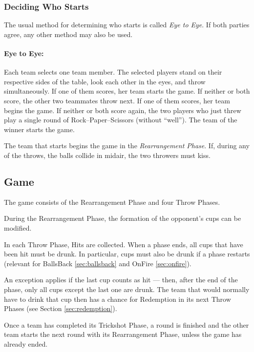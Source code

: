 \documentclass[a5paper, 12pt]{book}
\begin{document}
\subsubsection{Deciding Who Starts} \label{sec:decidewho}
The usual method for determining who starts is called \textit{Eye to Eye}.  
If both parties agree, any other method may also be used.

\paragraph{Eye to Eye:}
Each team selects one team member.  
The selected players stand on their respective sides of the table, look each other in the eyes, and throw simultaneously.  
If one of them scores, her team starts the game.  
If neither or both score, the other two teammates throw next.  
If one of them scores, her team begins the game.  
If neither or both score again, the two players who just threw play a single round of Rock–Paper–Scissors (without “well”).  
The team of the winner starts the game.  

The team that starts begins the game in the \textit{Rearrangement Phase}.  
If, during any of the throws, the balls collide in midair, the two throwers must kiss.

\subsection{Game}\label{subsec:spiel}

The game consists of the Rearrangement Phase and four Throw Phases.

During the Rearrangement Phase, the formation of the opponent’s cups can be modified.

In each Throw Phase, Hits are collected.  
When a phase ends, all cups that have been hit must be drunk.  
In particular, cups must also be drunk if a phase restarts (relevant for BallsBack \ref{sec:ballsback} and OnFire \ref{sec:onfire}).  

An exception applies if the last cup counts as hit — then, after the end of the phase, only all cups except the last one are drunk.  
The team that would normally have to drink that cup then has a chance for Redemption in its next Throw Phases (see Section \ref{sec:redemption}).

Once a team has completed its Trickshot Phase, a round is finished and the other team starts the next round with its Rearrangement Phase, unless the game has already ended.
\end{document}

